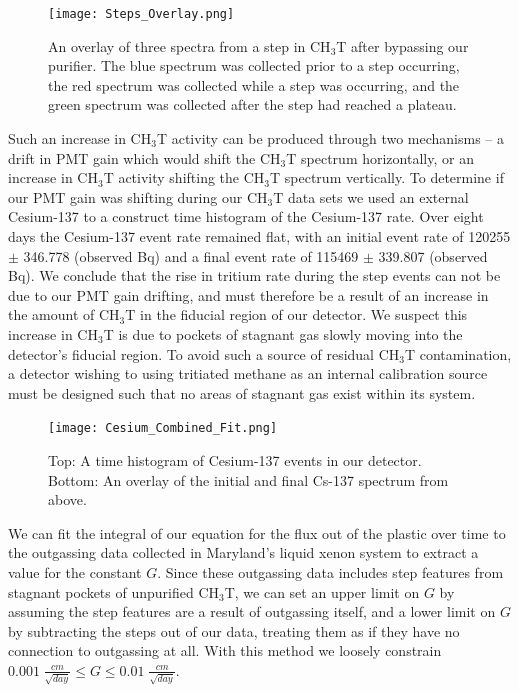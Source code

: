 \begin{figure}[h]
\centering
\texttt{[image: Steps\_Overlay.png]}
\caption{An overlay of three spectra from a step in CH$_3$T after bypassing our purifier.  The blue spectrum was collected prior to a step occurring, the red spectrum was collected while a step was occurring, and the green spectrum was collected after the step had reached a plateau.}
\label{fig:Steps}
\end{figure}

Such an increase in CH$_3$T activity can be produced through two mechanisms -- a drift in PMT gain which would shift the CH$_3$T spectrum horizontally, or an increase in CH$_3$T activity shifting the CH$_3$T spectrum vertically.  To determine if our PMT gain was shifting during our CH$_3$T data sets we used an external Cesium-137 to a construct time histogram of the Cesium-137 rate.  Over eight days the Cesium-137 event rate remained flat, with an initial event rate of 120255 $\pm$ 346.778 (observed Bq) and a final event rate of 115469 $\pm$ 339.807 (observed Bq). We conclude that the rise in tritium rate during the step events can not be due to our PMT gain drifting, and must therefore be a result of an increase in the amount of CH$_3$T in the fiducial region of our detector.  We suspect this increase in CH$_3$T is due to pockets of stagnant gas slowly moving into the detector's fiducial region.  To avoid such a source of residual CH$_3$T contamination, a detector wishing to using tritiated methane as an internal calibration source must be designed such that no areas of stagnant gas exist within its system.

\begin{figure}[h]
\centering
\texttt{[image: Cesium\_Combined\_Fit.png]}
\caption{Top: A time histogram of Cesium-137 events in our detector. Bottom: An overlay of the initial and final Cs-137 spectrum from above.}
\label{fig:CsFit}
\end{figure}

We can fit the integral of our equation for the flux out of the plastic over time to the outgassing data collected in Maryland's liquid xenon system to extract a value for the constant $G$. Since these outgassing data includes step features from stagnant pockets of unpurified CH$_3$T, we can set an upper limit on $G$ by assuming the step features are a result of outgassing itself, and a lower limit on $G$ by subtracting the steps out of our data, treating them as if they have no connection to outgassing at all. With this method we loosely constrain $0.001 \; \frac{cm}{\sqrt{day}} \leq G \leq 0.01 \; \frac{cm}{\sqrt{day}}.$ 

